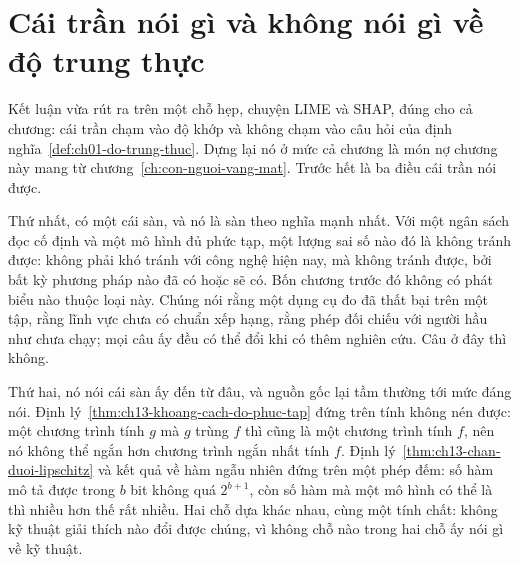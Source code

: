 \section{Cái trần nói gì và không nói gì về độ trung thực}
\label{sec:ch13-tran-noi-gi}

%
Kết luận vừa rút ra trên một chỗ hẹp, chuyện LIME và SHAP, đúng cho cả chương:
cái trần chạm vào độ khớp và không chạm vào câu hỏi của định
nghĩa~\ref{def:ch01-do-trung-thuc}. Dựng lại nó ở mức cả chương là món nợ chương
này mang từ chương~\ref{ch:con-nguoi-vang-mat}. Trước hết là ba điều cái trần
nói được.

Thứ nhất, có một cái sàn, và nó là sàn theo nghĩa mạnh nhất. Với một ngân sách
đọc cố định và một mô hình đủ phức tạp, một lượng sai số nào đó là không tránh
được: không phải khó tránh với công nghệ hiện nay, mà không tránh được, bởi bất
kỳ phương pháp nào đã có hoặc sẽ có. Bốn chương trước đó không có phát biểu nào
thuộc loại này. Chúng nói rằng một dụng cụ đo đã thất bại trên một tập, rằng
lĩnh vực chưa có chuẩn xếp hạng, rằng phép đối chiếu với người hầu như chưa
chạy; mọi câu ấy đều có thể đổi khi có thêm nghiên cứu. Câu ở đây thì không.

Thứ hai, nó nói cái sàn ấy đến từ đâu, và nguồn gốc lại tầm thường tới mức đáng
nói. Định lý~\ref{thm:ch13-khoang-cach-do-phuc-tap} đứng trên tính không nén
được: một chương trình tính $g$ mà $g$ trùng $f$ thì cũng là một chương trình
tính $f$, nên nó không thể ngắn hơn chương trình ngắn nhất tính $f$. Định
lý~\ref{thm:ch13-chan-duoi-lipschitz} và kết quả về hàm ngẫu nhiên đứng trên
một phép đếm: số hàm mô tả được trong $b$ bit không quá $2^{b+1}$, còn số hàm mà
một mô hình có thể là thì nhiều hơn thế rất nhiều. Hai chỗ dựa khác nhau, cùng
một tính chất: không kỹ thuật giải thích nào đổi được chúng, vì không chỗ nào
trong hai chỗ ấy nói gì về kỹ thuật.


